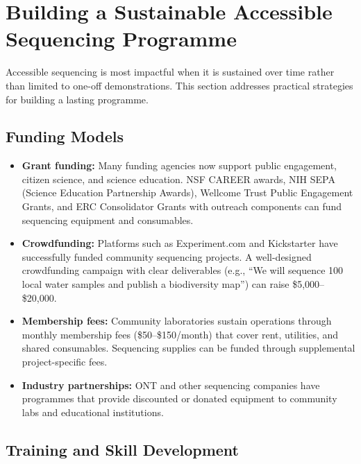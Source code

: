 \section{Building a Sustainable Accessible Sequencing Programme}
\label{sec:accessible:sustainable}

Accessible sequencing is most impactful when it is sustained over time rather than limited to one-off demonstrations. This section addresses practical strategies for building a lasting programme.

\subsection{Funding Models}
\label{subsec:accessible:funding}

\begin{itemize}[itemsep=2pt]
  \item \textbf{Grant funding:} Many funding agencies now support public engagement, citizen science, and science education. NSF CAREER awards, NIH SEPA (Science Education Partnership Awards), Wellcome Trust Public Engagement Grants, and ERC Consolidator Grants with outreach components can fund sequencing equipment and consumables.
  \item \textbf{Crowdfunding:} Platforms such as Experiment.com and Kickstarter have successfully funded community sequencing projects. A well-designed crowdfunding campaign with clear deliverables (e.g., ``We will sequence 100 local water samples and publish a biodiversity map'') can raise \$5,000--\$20,000.
  \item \textbf{Membership fees:} Community laboratories sustain operations through monthly membership fees (\$50--\$150/month) that cover rent, utilities, and shared consumables. Sequencing supplies can be funded through supplemental project-specific fees.
  \item \textbf{Industry partnerships:} \acrshort{ONT} and other sequencing companies have programmes that provide discounted or donated equipment to community labs and educational institutions.
\end{itemize}

\subsection{Training and Skill Development}
\label{subsec:accessible:training}

